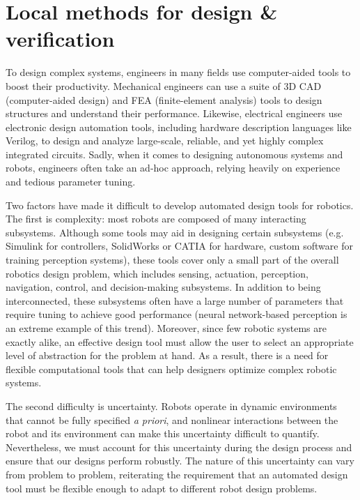 \chapter{Local methods for design \& verification}\label{section:local_methods}

To design complex systems, engineers in many fields use computer-aided tools to boost their productivity. Mechanical engineers can use a suite of 3D CAD (computer-aided design) and FEA (finite-element analysis) tools to design structures and understand their performance. Likewise, electrical engineers use electronic design automation tools, including hardware description languages like Verilog, to design and analyze large-scale, reliable, and yet highly complex integrated circuits. Sadly, when it comes to designing autonomous systems and robots, engineers often take an ad-hoc approach, relying heavily on experience and tedious parameter tuning.

Two factors have made it difficult to develop automated design tools for robotics. The first is complexity: most robots are composed of many interacting subsystems. Although some tools may aid in designing certain subsystems (e.g. Simulink for controllers, SolidWorks or CATIA for hardware, custom software for training perception systems), these tools cover only a small part of the overall robotics design problem, which includes sensing, actuation, perception, navigation, control, and decision-making subsystems. In addition to being interconnected, these subsystems often have a large number of parameters that require tuning to achieve good performance (neural network-based perception is an extreme example of this trend). Moreover, since few robotic systems are exactly alike, an effective design tool must allow the user to select an appropriate level of abstraction for the problem at hand. As a result, there is a need for flexible computational tools that can help designers optimize complex robotic systems.

The second difficulty is uncertainty. Robots operate in dynamic environments that cannot be fully specified \textit{a priori}, and nonlinear interactions between the robot and its environment can make this uncertainty difficult to quantify. Nevertheless, we must account for this uncertainty during the design process and ensure that our designs perform robustly. The nature of this uncertainty can vary from problem to problem, reiterating the requirement that an automated design tool must be flexible enough to adapt to different robot design problems.

